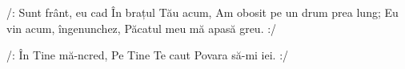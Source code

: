 \beginverse
/: Sunt frânt, eu cad
În brațul Tău acum,
Am obosit pe un drum prea lung;
Eu vin acum, îngenunchez,
Păcatul meu mă apasă greu. :/
\endverse

\beginchorus
/: În Tine mă-ncred,
Pe Tine Te caut
Povara să-mi iei. :/
\endchorus
\endsong